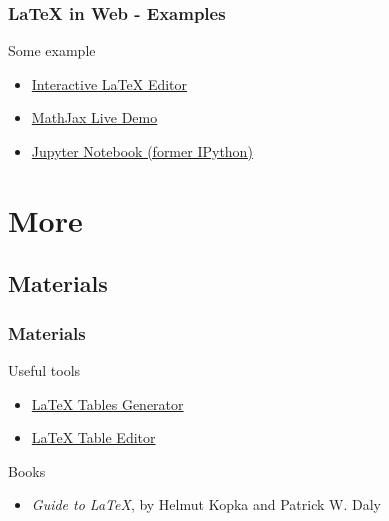\documentclass[slidestop,compress,mathserif]{beamer}
\begin{document}
		\begin{frame} \frametitle{LaTeX in Web - Examples}
			Some example\\
			
			\begin{itemize}
				\item \href{http://arachnoid.com/latex/}{Interactive LaTeX Editor}
				\item \href{https://github.com/mathjax/MathJax/blob/master/test/sample-dynamic-2.html}{MathJax Live Demo}
				\item \href{https://ipython.org/ipython-doc/3/install/install.html\#mathjax}{Jupyter Notebook (former IPython)}
			\end{itemize}
			
		\end{frame}

\section[More]{More}


\subsection[Materials]{Materials}
\begin{frame} 
		\frametitle{Materials}

		Useful tools
		\begin{itemize}
			\item \href{http://www.tablesgenerator.com/latex_tables}{LaTeX Tables Generator}
			\item \href{http://truben.no/table/}{LaTeX Table Editor}
		\end{itemize}
		Books
		\begin{itemize}
			\item \emph{Guide to LaTeX}, by Helmut Kopka and Patrick W. Daly
		\end{itemize}				
		
\end{frame}
\end{document}
